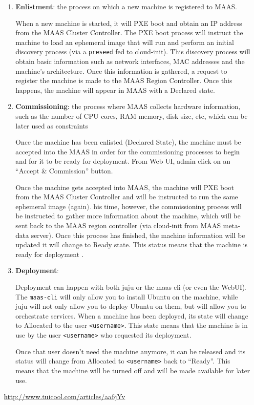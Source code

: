 \begin{enumerate}
  \item {\bf Enlistment}: the process on which a new machine is registered to
  MAAS. 
  
  When a new machine is started, it will PXE boot and obtain an IP address 
  from the MAAS Cluster Controller. The PXE boot process will instruct the machine to
  load an ephemeral image that will run and perform an initial discovery process
  (via a \verb!preseed! fed to cloud-init). This discovery process will obtain
  basic information such as network interfaces, MAC addresses and the machine's
  architecture. Once this information is gathered, a request to register the
  machine is made to the MAAS Region Controller. Once this happens, the machine
  will appear in MAAS with a  Declared state.
  
  \item {\bf Commissioning}:  the process where MAAS collects hardware
  information, such as the number of CPU cores, RAM memory, disk size, etc,
  which can be later used as constraints 
  
  Once the machine has been enlisted (Declared State), the machine must be
  accepted into the MAAS in order for the commissioning processes to begin and
  for it to be ready for deployment. From Web UI, admin click on
  an ``Accept \& Commission'' button.
  
   Once the machine gets accepted into MAAS, the machine will PXE boot from the
  MAAS Cluster Controller and will be instructed to run the same ephemeral image
  (again). his time, however, the commissioning process will be instructed to
  gather more information about the machine, which will be sent back to the MAAS
  region controller (via cloud-init from MAAS meta-data server). Once this
  process has finished, the machine information will be updated it will change
  to  Ready state. This status means that the machine is ready for deployment .
  
  \item {\bf Deployment}: 
  
  Deployment can happen with both juju or the maas-cli (or even the WebUI). The
  \verb!maas-cli! will only allow you to install Ubuntu on the machine, while 
  juju will not only allow you to deploy Ubuntu on them, but will allow you to
  orchestrate services. When a machine has been deployed, its state will change
  to Allocated to the user \verb!<username>!.  This state means that the machine
  is in use by the user \verb!<username>! who requested its deployment.
  
  Once that user doesn't need the machine anymore, it can be released and its
  status will change from  Allocated to \verb!<username>!  back to ``Ready''. This
  means that the machine will be turned off and will be made available for
  later use. 
\end{enumerate}
\url{http://www.tuicool.com/articles/aa6jYv}

